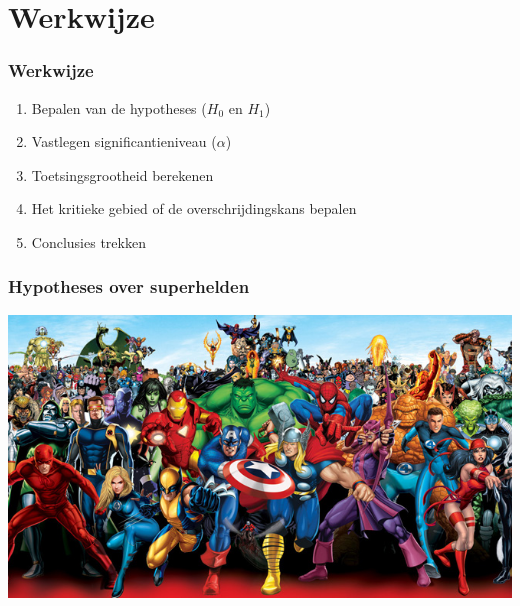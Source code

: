 \documentclass{beamer}
\begin{document}
\section{Werkwijze}
\sectionframelogo{}

\begin{frame}
  \frametitle{Werkwijze}

  \begin{enumerate}
    \item Bepalen van de hypotheses ($H_0$ en $H_1$)
    \item Vastlegen significantieniveau ($\alpha$)
    \item Toetsingsgrootheid berekenen
    \item Het kritieke gebied of de overschrijdingskans bepalen
    \item Conclusies trekken
  \end{enumerate}
\end{frame}

\begin{frame}
  \frametitle{Hypotheses over superhelden}

  \includegraphics[width=\textwidth]{img/les5-heroes}
\end{frame}
\end{document}
